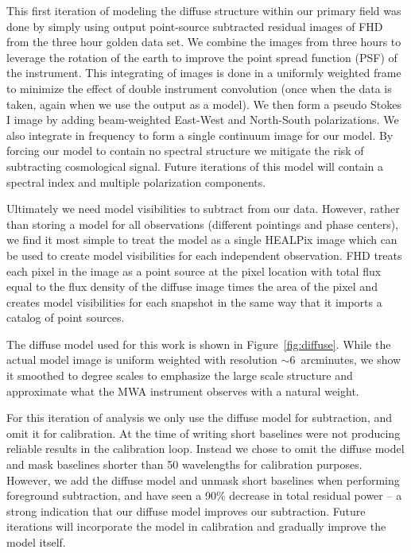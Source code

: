 \documentclass[iop]{emulateapj}
\begin{document}
This first iteration of modeling the diffuse structure within our primary field was done by 
simply using output point-source subtracted residual images of FHD from the three hour 
golden data set. We combine the images from three hours to leverage the rotation of the 
earth to improve the point spread function (PSF) of the instrument. This integrating of 
images is done in a uniformly weighted frame to minimize the effect of double instrument 
convolution (once when the data is taken, again when we use the output as a model). We 
then form a pseudo Stokes I image by adding beam-weighted East-West and North-South 
polarizations. We also integrate in frequency to form a single continuum image for our 
model. By forcing our model to contain no spectral structure we mitigate the risk of 
subtracting cosmological signal. Future iterations of this model will contain a spectral index 
and multiple polarization components.

Ultimately we need model visibilities to subtract from our data. However, rather than storing 
a model for all observations (different pointings and phase centers), we find it most simple 
to treat the model as a single HEALPix image which can be used to create model visibilities 
for each independent observation. FHD treats each pixel in the image as a point source at 
the pixel location with total flux equal to the flux density of the diffuse image times the area 
of the pixel and creates model visibilities for each snapshot in the same way that it imports 
a catalog of point sources.

The diffuse model used for this work is shown in Figure~\ref{fig:diffuse}. While the actual 
model image is uniform weighted with resolution $\sim\!6$~arcminutes, we show it 
smoothed to degree scales to emphasize the large scale structure and approximate what 
the MWA instrument observes with a natural weight.

For this iteration of analysis we only use the diffuse model for subtraction, and omit it for 
calibration. At the time of writing short baselines were not producing reliable results in the 
calibration loop. Instead we chose to omit the diffuse model and mask baselines shorter 
than 50 wavelengths for calibration purposes. However, we add the diffuse model and 
unmask short baselines when performing foreground subtraction, and have seen a 90\% 
decrease in total residual power -- a strong indication that our diffuse model improves our 
subtraction. Future iterations will incorporate the model in calibration and gradually improve 
the model itself. 
\end{document}
